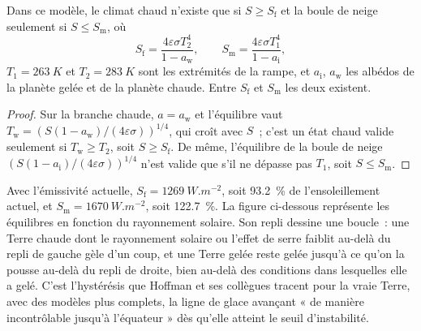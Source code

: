 \begin{proposition}\label{prop:b2:precambrian-earth:tipping}
Dans ce modèle, le climat chaud n'existe que si $S \ge S_{\text{f}}$ et la boule de neige seulement si
$S \le S_{\text{m}}$, où
\[
  S_{\text{f}} = \frac{4\varepsilon\sigma T_2^4}{1 - a_{\text{w}}}, \qquad
  S_{\text{m}} = \frac{4\varepsilon\sigma T_1^4}{1 - a_{\text{i}}},
\]
$T_1 = \qty{263}{K}$ et $T_2 = \qty{283}{K}$ sont les extrémités de la rampe, et $a_{\text{i}}$,
$a_{\text{w}}$ les albédos de la planète gelée et de la planète chaude. Entre $S_{\text{f}}$ et
$S_{\text{m}}$ les deux existent.
\end{proposition}

\begin{proof}
Sur la branche chaude, $a = a_{\text{w}}$ et l'équilibre vaut $T_{\text{w}} = (S(1 -
a_{\text{w}})/(4\varepsilon\sigma))^{1/4}$, qui croît avec $S$~; c'est un état chaud valide seulement
si $T_{\text{w}} \ge T_2$, soit $S \ge S_{\text{f}}$. De même, l'équilibre de la boule de neige
$(S(1 - a_{\text{i}})/(4\varepsilon\sigma))^{1/4}$ n'est valide que s'il ne dépasse pas $T_1$, soit
$S \le S_{\text{m}}$.
\end{proof}

Avec l'émissivité actuelle, $S_{\text{f}} = \qty{1269}{W.m^{-2}}$, soit \qty{93.2}{\percent} de l'ensoleillement actuel,
et $S_{\text{m}} = \qty{1670}{W.m^{-2}}$, soit \qty{122.7}{\percent}. La figure ci-dessous
représente les équilibres en fonction du rayonnement solaire. Son repli dessine une boucle~: une Terre chaude dont le
rayonnement solaire ou l'effet de serre faiblit au-delà du repli de gauche gèle d'un coup, et une Terre gelée reste gelée
jusqu'à ce qu'on la pousse au-delà du repli de droite, bien au-delà des conditions dans lesquelles elle a gelé. C'est
l'hystérésis que Hoffman et ses collègues tracent pour la vraie Terre, avec des modèles plus complets, la ligne de glace
avançant « de manière incontrôlable jusqu'à l'équateur » dès qu'elle atteint le
seuil d'instabilité.


